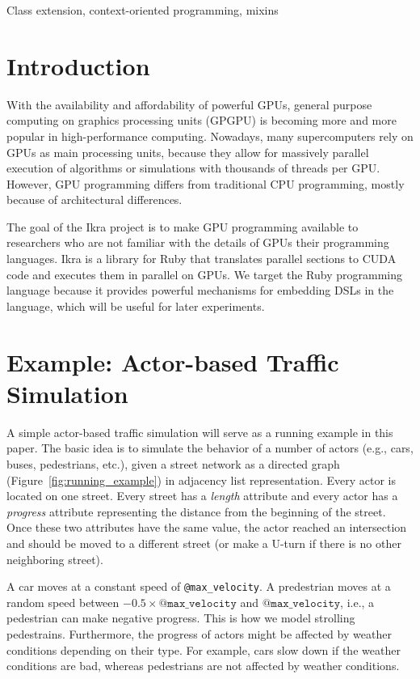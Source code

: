 \documentclass[preprint]{sigplanconf}
\begin{document}


\keywords
Class extension, context-oriented programming, mixins

\section{Introduction}
With the availability and affordability of powerful GPUs, general purpose computing on graphics processing units (GPGPU) is becoming more and more popular in high-performance computing. Nowadays, many supercomputers rely on GPUs as main processing units, because they allow for massively parallel execution of algorithms or simulations with thousands of threads per GPU. However, GPU programming differs from traditional CPU programming, mostly because of architectural differences.

The goal of the Ikra project is to make GPU programming available to researchers who are not familiar with the details of GPUs their programming languages. Ikra is a library for Ruby that translates parallel sections to CUDA code and executes them in parallel on GPUs. We target the Ruby programming language because it provides powerful mechanisms for embedding DSLs in the language, which will be useful for later experiments.

\section{Example: Actor-based Traffic Simulation}
A simple actor-based traffic simulation will serve as a running example in this paper. The basic idea is to simulate the behavior of a number of actors (e.g., cars, buses, pedestrians, etc.), given a street network as a directed graph (Figure~\ref{fig:running_example}) in adjacency list representation. Every actor is located on one street. Every street has a \emph{length} attribute and every actor has a \emph{progress} attribute representing the distance from the beginning of the street. Once these two attributes have the same value, the actor reached an intersection and should be moved to a different street (or make a U-turn if there is no other neighboring street).

A car moves at a constant speed of \texttt{@max\_velocity}. A predestrian moves at a random speed between $-0.5 \times \texttt{@max\_velocity}$ and $\texttt{@max\_velocity}$, i.e., a pedestrian can make negative progress. This is how we model strolling pedestrains. Furthermore, the progress of actors might be affected by weather conditions depending on their type. For example, cars slow down if the weather conditions are bad, whereas pedestrians are not affected by weather conditions.
\end{document}
